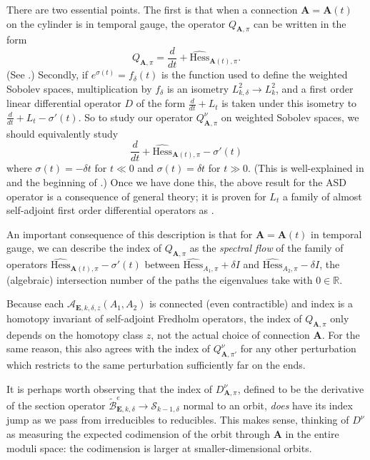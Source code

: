 \documentclass{memo-l}
\theoremstyle{definition}
\theoremstyle{remark}
\numberwithin{section}{chapter}
\numberwithin{equation}{chapter}
\begin{document}
There are two essential points. The first is that when a connection $\mathbf{A} = \mathbf{A}(t)$ on the cylinder is in temporal gauge, the operator $Q_{\mathbf{A},\pi}$ can be written in the form $$Q_{\mathbf{A}, \pi} = \frac{d}{dt} + \widehat{\text{Hess}}_{\mathbf{A}(t), \pi}.$$ (See \cite[Section~2.5]{Don}.) Secondly, if $e^{\sigma(t)} = f_\delta(t)$ is the function used to define the weighted Sobolev spaces, multiplication by $f_\delta$ is an isometry $L^2_{k,\delta} \to L^2_k$, and a first order linear differential operator $D$ of the form $\frac{d}{dt} + L_t$ is taken under this isometry to $\frac{d}{dt} + L_t - \sigma'(t)$. So to study our operator $Q^\nu_{\mathbf{A},\pi}$ on weighted Sobolev spaces, we should equivalently study 
$$\frac{d}{dt} + \widehat{\text{Hess}}_{\mathbf{A}(t),\pi} - \sigma'(t)$$ 
where $\sigma(t) = -\delta t$ for $t \ll 0$ and $\sigma(t) = \delta t$ for $t \gg 0$. (This is well-explained in \cite[Section~3.3.1]{Don} and the beginning of \cite[Section~3.3]{Lin}.) Once we have done this, the above result for the ASD operator is a consequence of general theory; it is proven for $L_t$ a family of almost self-adjoint first order differential operators as \cite[Proposition~14.2.1]{KMSW}.

An important consequence of this description is that for $\mathbf{A} = \mathbf{A}(t)$ in temporal gauge, we can describe the index of $Q_{\mathbf{A},\pi}$ as the \textit{spectral flow} of the family of operators $\widehat{\text{Hess}}_{\mathbf{A}(t), \pi} - \sigma'(t)$ between $\widehat{\text{Hess}}_{A_1, \pi} + \delta I$ and $\widehat{\text{Hess}}_{A_2, \pi} - \delta I$, the (algebraic) intersection number of the paths the eigenvalues take with $0 \in \mathbb R$. 

Because each $\mathcal A_{\mathbf{E},k,\delta,z}(A_1,A_2)$ is connected (even contractible) and index is a homotopy invariant of self-adjoint Fredholm operators, the index of $Q_{\mathbf{A},\pi}$ only depends on the homotopy class $z$, not the actual choice of connection $\mathbf{A}$. For the same reason, this also agrees with the index of $Q^\nu_{\mathbf{A},\pi'}$ for any other perturbation which restricts to the same perturbation sufficiently far on the ends. 

It is perhaps worth observing that the index of $D^\nu_{\mathbf{A},\pi}$, defined to be the derivative of the section operator $\widetilde{\mathcal B}^e_{\mathbf{E},k,\delta} \to \mathcal S_{k-1,\delta}$ normal to an orbit, \emph{does} have its index jump as we pass from irreducibles to reducibles. This makes sense, thinking of $D^\nu$ as measuring the expected codimension of the orbit through $\mathbf{A}$ in the entire moduli space: the codimension is larger at smaller-dimensional orbits.
\end{document}
